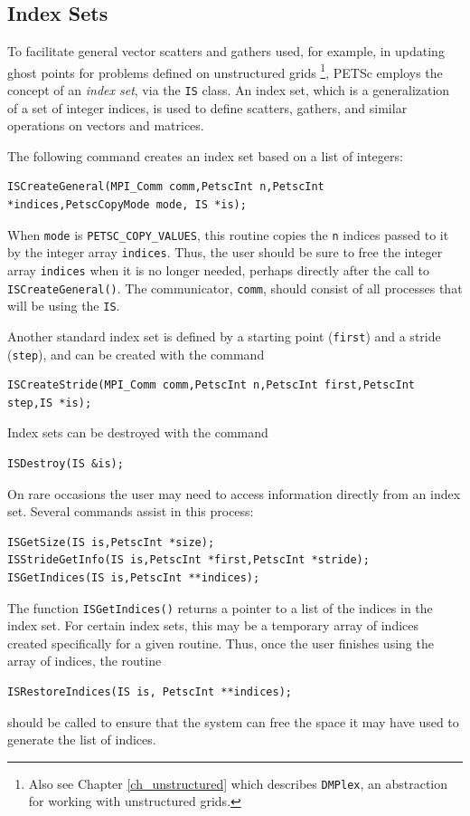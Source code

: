 \subsection{Index Sets} 
\label{sec_indexset}

To facilitate general vector scatters and gathers used, for example, in updating
ghost points for problems defined on unstructured grids
\footnote{Also see Chapter \ref{ch_unstructured} which describes \lstinline{DMPlex}, an abstraction for working with unstructured grids.},
PETSc employs the concept of an {\em index set}, via the \lstinline{IS} class.  
An index set, which is a generalization of a
set of integer indices, is used to define scatters, gathers, and similar
operations on vectors and matrices.

The following command creates an index set based on a list
of integers:
\begin{lstlisting}
ISCreateGeneral(MPI_Comm comm,PetscInt n,PetscInt *indices,PetscCopyMode mode, IS *is);
\end{lstlisting}
When \lstinline{mode} is \lstinline{PETSC_COPY_VALUES}, this routine copies the \lstinline{n} indices passed
to it by the integer array \lstinline{indices}.
Thus, the user should be sure to free the integer array \lstinline{indices}
when it is no longer needed, perhaps directly after the call to
\lstinline{ISCreateGeneral()}. The communicator, \lstinline{comm}, should consist of all
processes that will be using the \lstinline{IS}.

Another standard index set is defined by a starting point (\lstinline{first}) and a
stride (\lstinline{step}),  and can be created with the command
\begin{lstlisting}
ISCreateStride(MPI_Comm comm,PetscInt n,PetscInt first,PetscInt step,IS *is);
\end{lstlisting}

Index sets can be destroyed with the command
\begin{lstlisting}
ISDestroy(IS &is);
\end{lstlisting}

On rare occasions the user may need to access information directly from an index set.
Several commands assist in this process:
\begin{lstlisting}
ISGetSize(IS is,PetscInt *size);
ISStrideGetInfo(IS is,PetscInt *first,PetscInt *stride);
ISGetIndices(IS is,PetscInt **indices);
\end{lstlisting}
The function \lstinline{ISGetIndices()} returns a pointer to a list of the
indices in the index set.
For certain index sets, this may be a
temporary array of indices created specifically for a given routine.
Thus, once the user finishes using the array of indices,
the routine
\begin{lstlisting}
ISRestoreIndices(IS is, PetscInt **indices);
\end{lstlisting}
should be called to ensure that the system can free the space it
may have used to generate the list of indices.

